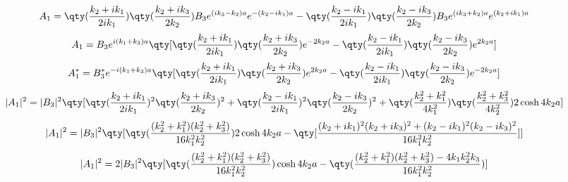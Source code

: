 \[A_1=\qty(\frac{k_2+ik_1}{2ik_1})\qty(\frac{k_2+ik_3}{2k_2})B_3e^{(ik_3-k_2)a}e^{-(k_2-ik_1)a}-\qty(\frac{k_2-ik_1}{2ik_1})\qty(\frac{k_2-ik_3}{2k_2})B_3e^{(ik_3+k_2)a}e^{(k_2+ik_1)a}\]
\[A_1=B_3e^{i(k_1+k_3)a}\qty[\qty(\frac{k_2+ik_1}{2ik_1})\qty(\frac{k_2+ik_3}{2k_2})e^{-2k_2a}-\qty(\frac{k_2-ik_1}{2ik_1})\qty(\frac{k_2-ik_3}{2k_2})e^{2k_2a}]\]
\[A_1^*=B_3^*e^{-i(k_1+k_3)a}\qty[\qty(\frac{k_2+ik_1}{2ik_1})\qty(\frac{k_2+ik_3}{2k_2})e^{2k_2a}-\qty(\frac{k_2-ik_1}{2ik_1})\qty(\frac{k_2-ik_3}{2k_2})e^{-2k_2a}]\]
\[|A_1|^2=|B_3|^2\qty[\qty(\frac{k_2+ik_1}{2ik_1})^2\qty(\frac{k_2+ik_3}{2k_2})^2+\qty(\frac{k_2-ik_1}{2ik_1})^2\qty(\frac{k_2-ik_3}{2k_2})^2+\qty(\frac{k_2^2+k_1^2}{4k_1^2})\qty(\frac{k_2^2+k_3^2}{4k_2^2})2\cosh{4k_2a}]\]
\[|A_1|^2=|B_3|^2\qty[\qty(\frac{(k_2^2+k_1^2)(k_2^2+k_3^2)}{16k_1^2k_2^2})2\cosh{4k_2a}-\qty[\frac{(k_2+ik_1)^2(k_2+ik_3)^2+(k_2-ik_1)^2(k_2-ik_3)^2}{16k_1^2k_2^2}]]\]
\[|A_1|^2=2|B_3|^2\qty[\qty(\frac{(k_2^2+k_1^2)(k_2^2+k_3^2)}{16k_1^2k_2^2})\cosh{4k_2a}-\qty(\frac{(k_2^2+k_1^2)(k_2^2+k_3^2)-4k_1k_2^2k_3}{16k_1^2k_2^2})]\]
